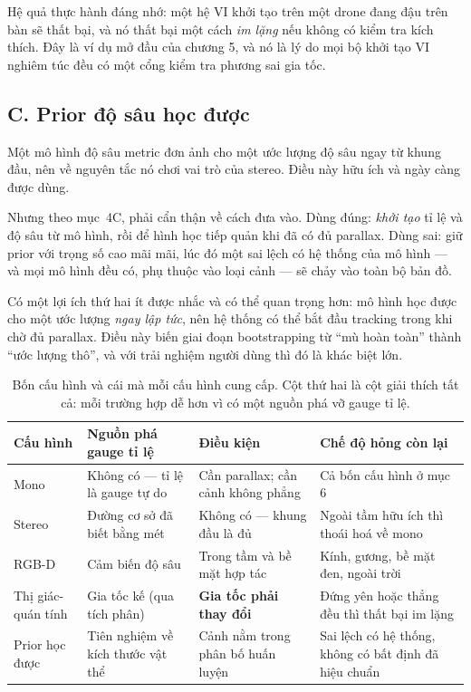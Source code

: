 \documentclass[../../vslam.tex]{subfiles}
\begin{document}
Hệ quả thực hành đáng nhớ: một hệ VI khởi tạo trên một drone đang đậu trên bàn sẽ thất bại, và nó thất bại một cách \emph{im lặng} nếu không có kiểm tra kích thích. Đây là ví dụ mở đầu của  chương 5, và nó là lý do mọi bộ khởi tạo VI nghiêm túc đều có một cổng kiểm tra phương sai gia tốc.

\subsection{C. Prior độ sâu học được}

Một mô hình độ sâu metric đơn ảnh cho một ước lượng độ sâu ngay từ khung đầu, nên về nguyên tắc nó chơi vai trò của stereo. Điều này hữu ích và ngày càng được dùng.

Nhưng theo  mục~4C, phải cẩn thận về cách đưa vào. Dùng đúng: \emph{khởi tạo} tỉ lệ và độ sâu từ mô hình, rồi để hình học tiếp quản khi đã có đủ parallax. Dùng sai: giữ prior với trọng số cao mãi mãi, lúc đó một sai lệch có hệ thống của mô hình --- và mọi mô hình đều có, phụ thuộc vào loại cảnh --- sẽ chảy vào toàn bộ bản đồ.

Có một lợi ích thứ hai ít được nhắc và có thể quan trọng hơn: mô hình học được cho một ước lượng \emph{ngay lập tức}, nên hệ thống có thể bắt đầu tracking trong khi chờ đủ parallax. Điều này biến giai đoạn bootstrapping từ ``mù hoàn toàn'' thành ``ước lượng thô'', và với trải nghiệm người dùng thì đó là khác biệt lớn.

\begin{table}[H]\centering\small
\caption{Bốn cấu hình và cái mà mỗi cấu hình cung cấp. Cột thứ hai là cột giải thích tất cả: mỗi trường hợp dễ hơn vì có một nguồn phá vỡ gauge tỉ lệ.}
\label{tab:b10-init}
\begin{tabularx}{\linewidth}{@{}L{2.1cm}L{3.3cm}L{3.0cm}Y@{}}
\toprule
\textbf{Cấu hình} & \textbf{Nguồn phá gauge tỉ lệ} & \textbf{Điều kiện} & \textbf{Chế độ hỏng còn lại}\\
\midrule
Mono & Không có --- tỉ lệ là gauge tự do & Cần parallax; cần cảnh không phẳng & Cả bốn cấu hình ở  mục 6\\
Stereo & Đường cơ sở đã biết bằng mét & Không có --- khung đầu là đủ & Ngoài tầm hữu ích thì thoái hoá về mono\\
RGB-D & Cảm biến độ sâu & Trong tầm và bề mặt hợp tác & Kính, gương, bề mặt đen, ngoài trời\\
Thị giác-quán tính & Gia tốc kế (qua tích phân) & \textbf{Gia tốc phải thay đổi} & Đứng yên hoặc thẳng đều thì thất bại im lặng\\
Prior học được & Tiên nghiệm về kích thước vật thể & Cảnh nằm trong phân bố huấn luyện & Sai lệch có hệ thống, không có bất định đã hiệu chuẩn\\
\bottomrule
\end{tabularx}
\end{table}
\end{document}
